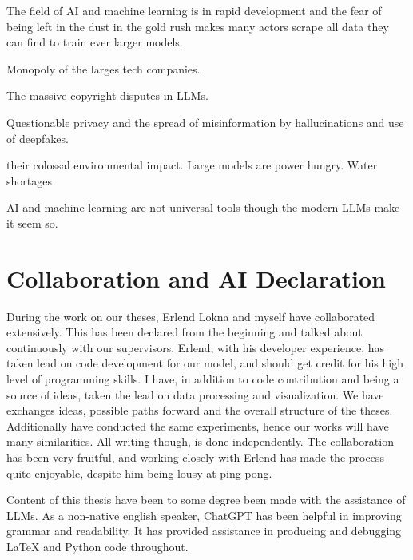 \documentclass[../../thesis.tex]{subfiles}
\begin{document}
The field of AI and machine learning is in rapid development and the fear of being left in the dust in the gold rush makes many actors scrape all data they can find to train ever larger models. 

Monopoly of the larges tech companies.

The massive copyright disputes in LLMs.

Questionable privacy and the spread of misinformation by hallucinations and use of deepfakes.

their colossal environmental impact. Large models are power hungry. Water shortages 


AI and machine learning are not universal tools though the modern LLMs make it seem so.

\section{Collaboration and AI Declaration}

During the work on our theses, Erlend Lokna and myself have collaborated extensively. This has been declared from the beginning and talked about continuously with our supervisors. Erlend, with his developer experience, has taken lead on code development for our model, and should get credit for his high level of programming skills. I have, in addition to code contribution and being a source of ideas, taken the lead on data processing and visualization. We have exchanges ideas, possible paths forward and the overall structure of the theses. Additionally have conducted the same experiments, hence our works will have many similarities. All writing though, is done independently. The collaboration has been very fruitful, and working closely with Erlend has made the process quite enjoyable, despite him being lousy at ping pong. \newline

Content of this thesis have been to some degree been made with the assistance of LLMs. As a non-native english speaker, ChatGPT has been helpful in improving grammar and readability. It has provided assistance in producing and debugging LaTeX and Python code throughout.
\end{document}
